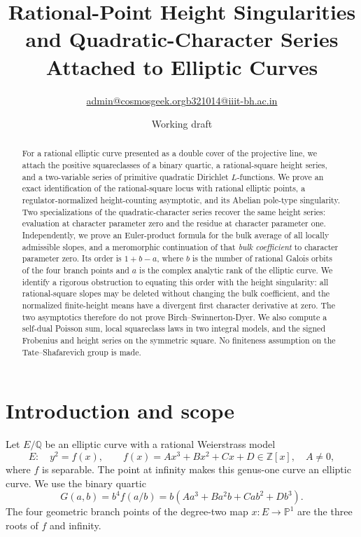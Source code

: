\documentclass[11pt]{article}
\title{Rational-Point Height Singularities and Quadratic-Character Series Attached to Elliptic Curves}
\author{\small \href{mailto:admin@cosmosgeek.org}{admin@cosmosgeek.org}\qquad \href{mailto:b321014@iiit-bh.ac.in}{b321014@iiit-bh.ac.in}}
\date{Working draft}
\newcommand{\Q}{\mathbb{Q}}
\newcommand{\Z}{\mathbb{Z}}
\begin{document}
\maketitle

\begin{abstract}
For a rational elliptic curve presented as a double cover of the projective line, we attach the positive squareclasses of a binary quartic, a rational-square height series, and a two-variable series of primitive quadratic Dirichlet $L$-functions.  We prove an exact identification of the rational-square locus with rational elliptic points, a regulator-normalized height-counting asymptotic, and its Abelian pole-type singularity.  Two specializations of the quadratic-character series recover the same height series: evaluation at character parameter zero and the residue at character parameter one.  Independently, we prove an Euler-product formula for the bulk average of all locally admissible slopes, and a meromorphic continuation of that \emph{bulk coefficient} to character parameter zero.  Its order is $1+b-a$, where $b$ is the number of rational Galois orbits of the four branch points and $a$ is the complex analytic rank of the elliptic curve.  We identify a rigorous obstruction to equating this order with the height singularity: all rational-square slopes may be deleted without changing the bulk coefficient, and the normalized finite-height means have a divergent first character derivative at zero.  The two asymptotics therefore do not prove Birch--Swinnerton-Dyer.  We also compute a self-dual Poisson sum, local squareclass laws in two integral models, and the signed Frobenius and height series on the symmetric square. No finiteness assumption on the Tate--Shafarevich group is made.
\end{abstract}

\section{Introduction and scope}
Let $E/\Q$ be an elliptic curve with a rational Weierstrass model
\begin{equation}\label{eq:model}
 E:\quad y^2=f(x),\qquad
 f(x)=A x^3+B x^2+C x+D\in\Z[x],\quad A\ne0,
\end{equation}
where $f$ is separable.  The point at infinity makes this genus-one curve an elliptic curve.  We use the binary quartic
\begin{equation}\label{eq:quartic}
 G(a,b)=b^4f(a/b)
       =b(Aa^3+Ba^2b+Cab^2+Db^3).
\end{equation}
The four geometric branch points of the degree-two map $x:E\to\mathbb{P}^1$ are the three roots of $f$ and infinity.
\end{document}
